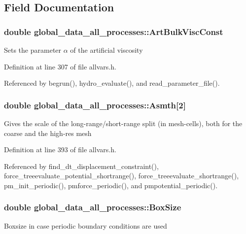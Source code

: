 \subsection{Field Documentation}
\hypertarget{structglobal__data__all__processes_a14b9df6a6579d2ce6ef7c86aa0230217}{
\subsubsection[{ArtBulkViscConst}]{\setlength{\rightskip}{0pt plus 5cm}double {\bf global\_\-data\_\-all\_\-processes::ArtBulkViscConst}}}
\label{structglobal__data__all__processes_a14b9df6a6579d2ce6ef7c86aa0230217}
Sets the parameter $\alpha$ of the artificial viscosity 

Definition at line 307 of file allvars.h.



Referenced by begrun(), hydro\_\-evaluate(), and read\_\-parameter\_\-file().

\hypertarget{structglobal__data__all__processes_a3bf3f2dd9be45f8f203424e57b9d9de3}{
\subsubsection[{Asmth}]{\setlength{\rightskip}{0pt plus 5cm}double {\bf global\_\-data\_\-all\_\-processes::Asmth}\mbox{[}2\mbox{]}}}
\label{structglobal__data__all__processes_a3bf3f2dd9be45f8f203424e57b9d9de3}
Gives the scale of the long-\/range/short-\/range split (in mesh-\/cells), both for the coarse and the high-\/res mesh 

Definition at line 393 of file allvars.h.



Referenced by find\_\-dt\_\-displacement\_\-constraint(), force\_\-treeevaluate\_\-potential\_\-shortrange(), force\_\-treeevaluate\_\-shortrange(), pm\_\-init\_\-periodic(), pmforce\_\-periodic(), and pmpotential\_\-periodic().

\hypertarget{structglobal__data__all__processes_ac1b2e52cf547f5b2fe4bdfb0eaafa22f}{
\subsubsection[{BoxSize}]{\setlength{\rightskip}{0pt plus 5cm}double {\bf global\_\-data\_\-all\_\-processes::BoxSize}}}
\label{structglobal__data__all__processes_ac1b2e52cf547f5b2fe4bdfb0eaafa22f}
Boxsize in case periodic boundary conditions are used 

